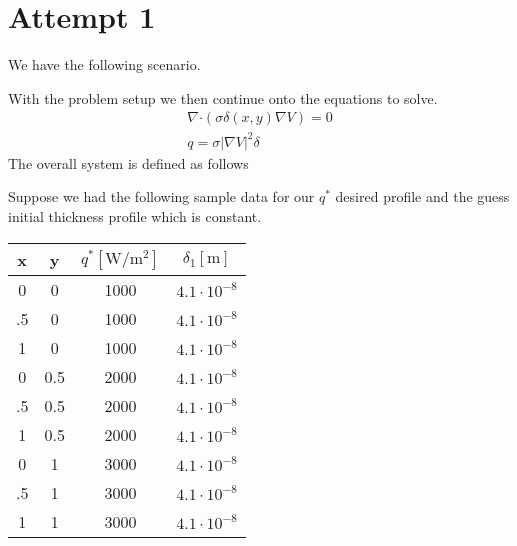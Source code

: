 \documentclass[12pt]{article}
\begin{document}
\section{Attempt 1}
We have the following scenario.
\begin{figure}[H]
\centering
{}
\end{figure}
With the problem setup we then continue onto the equations to solve.
\begin{gather}
\nabla \boldsymbol{\cdot} (\sigma \delta(x,y) \nabla V) = 0 \\
q = \sigma|\nabla V|^2 \delta
\end{gather}
The overall system is defined as follows
\begin{figure}[H]
\centering
{}
\end{figure}
Suppose we had the following sample data for our $q^*$ desired profile and the guess initial thickness profile which is constant.
\begin{table}[H]
\centering
\begin{tabular}{c c c c}
\hline \hline
x & y & $q^* [\si{\watt \per \meter^2}]$ & $\delta_{1} [\si{\meter}]$ \\ [0.5ex] 
\hline
0 & 0 & 1000 & $4.1\cdot10^{-8}$ \\
.5 & 0 & 1000& $4.1\cdot10^{-8}$\\
1 & 0 & 1000& $4.1\cdot10^{-8}$\\
0 & 0.5 & 2000& $4.1\cdot10^{-8}$\\
.5 & 0.5 & 2000& $4.1\cdot10^{-8}$\\
1 &0.5 & 2000& $4.1\cdot10^{-8}$\\
0 &1 & 3000& $4.1\cdot10^{-8}$\\
.5 &1 & 3000& $4.1\cdot10^{-8}$\\
1 &1 & 3000& $4.1\cdot10^{-8}$\\
\end{tabular}
\end{table}
\end{document}
